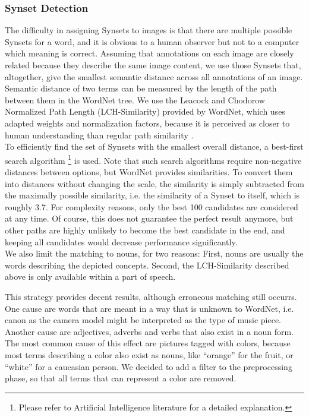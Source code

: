 \subsubsection{Synset Detection}
\label{sec_synsetdetection}
The difficulty in assigning Synsets to images is that there are multiple possible Synsets for a word, and it is obvious to a human observer but not to a computer which meaning is correct. Assuming that annotations on each image are closely related because they describe the same image content, we use those Synsets that, altogether, give the smallest semantic distance across all annotations of an image. Semantic distance of two terms can be measured by the length of the path between them in the WordNet tree. We use the Leacock and Chodorow Normalized Path Length (LCH-Similarity) provided by WordNet, which uses adapted weights and normalization factors, because it is perceived as closer to human understanding than regular path similarity \cite{budanitsky01}. \\

To efficiently find the set of Synsets with the smallest overall distance, a best-first search algorithm \footnote{Please refer to Artificial Intelligence literature for a detailed explanation.} is used. Note that such search algorithms require non-negative distances between options, but WordNet provides similarities. To convert them into distances without changing the scale, the similarity is simply subtracted from the maximally possible similarity, i.e. the similarity of a Synset to itself, which is roughly 3.7.
For complexity reasons, only the best 100 candidates are considered at any time. Of course, this does not guarantee the perfect result anymore, but other paths are highly unlikely to become the best candidate in the end, and keeping all candidates would decrease performance significantly. \\
We also limit the matching to nouns, for two reasons: First, nouns are usually the words describing the depicted concepts. Second, the LCH-Similarity described above is only available within a part of speech. 

This strategy provides decent results, although erroneous matching still occurrs. One cause are words that are meant in a way that is unknown to WordNet, i.e. canon as the camera model might be interpreted as the type of music piece. Another cause are adjectives, adverbs and verbs that also exist in a noun form. The most common cause of this effect are pictures tagged with colors, because most terms describing a color also exist as nouns, like ``orange'' for the fruit, or ``white'' for a caucasian person. We decided to add a filter to the preprocessing phase, so that all terms that can represent a color are removed. \\

